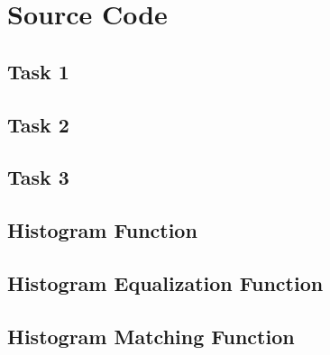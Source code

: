\section{Source Code}

\subsection{Task 1}



\pagebreak

\subsection{Task 2}



\pagebreak

\subsection{Task 3}



\pagebreak

\subsection{Histogram Function}



\pagebreak

\subsection{Histogram Equalization Function}



\pagebreak

\subsection{Histogram Matching Function}



